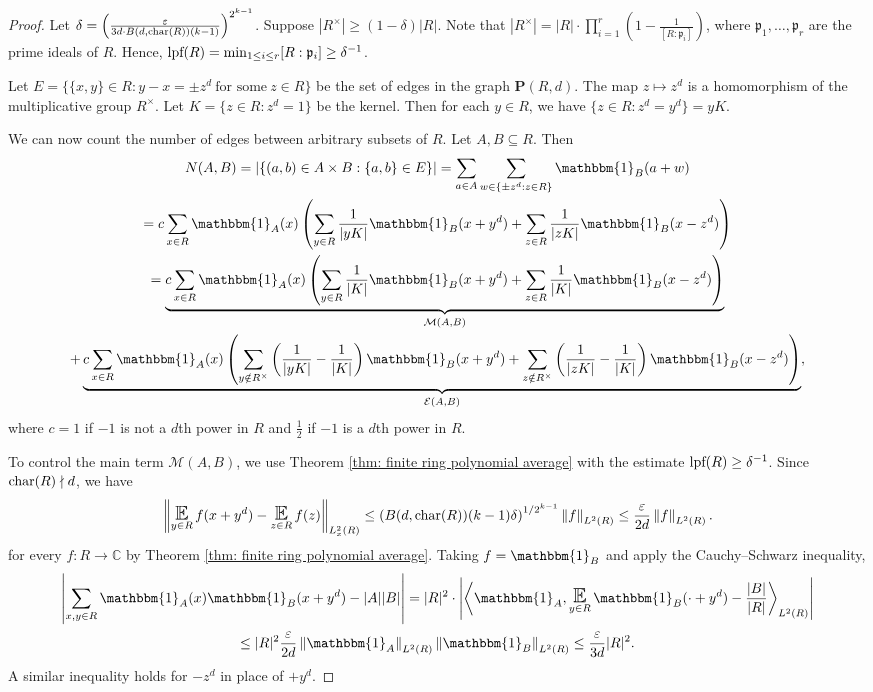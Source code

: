 \documentclass{amsart}
\theoremstyle{definition}
\numberwithin{equation}{section}
\newcommand{\C}{\mathbb{C}}
\newcommand{\p}{\mathfrak{p}}
\newcommand{\bfP}{\mathbf{P}}
\newcommand{\eps}{\varepsilon}
\newcommand{\lpf}{\normalfont\text{lpf}}
\DeclareMathOperator*{\E}{\text{\Large $\mathbb{E}$}}
\newcommand{\ind}{\mathbbm{1}}
\newcommand{\innprod}[2]{\left\langle #1, #2 \right\rangle}
\newcommand{\norm}[2]{\left\| #2 \right\|_{#1}}
\renewcommand{\char}{\textup{char}}
\begin{document}
\begin{proof}
    Let $\delta = \left( \frac{\eps}{3d \cdot B(d,\char(R)) (k-1)} \right)^{2^{k-1}}$.
    Suppose $|R^{\times}| \ge (1 - \delta)|R|$.
    Note that $|R^{\times}| = |R| \cdot \prod_{i=1}^r \left( 1 - \frac{1}{[R:\p_i]} \right)$, where $\p_1, \ldots, \p_r$ are the prime ideals of $R$.
    Hence, $\lpf(R) = \min_{1 \le i \le r} [R:\p_i] \ge \delta^{-1}$.

    
    Let $E = \{\{x,y\} \in R : y - x = \pm z^d~\text{for some}~z \in R\}$ be the set of edges in the graph $\bfP(R,d)$.
    The map $z \mapsto z^d$ is a homomorphism of the multiplicative group $R^{\times}$.
    Let $K = \{z \in R : z^d = 1\}$ be the kernel.
    Then for each $y \in R$, we have $\{z \in R : z^d = y^d\} = yK$.

    We can now count the number of edges between arbitrary subsets of $R$.
    Let $A, B \subseteq R$.
    Then
    \begin{multline*}
        N(A,B) = |\{(a,b) \in A \times B : \{a,b\} \in E\}|
        = \sum_{a \in A} \sum_{w \in \{\pm z^d : z \in R\}} \ind_B(a + w) \\
        = c \sum_{x \in R} \ind_A(x) \left( \sum_{y \in R} \frac{1}{|yK|}\ind_B(x+y^d) + \sum_{z \in R} \frac{1}{|zK|} \ind_B(x - z^d) \right) \\
         = \underbrace{c \sum_{x \in R} \ind_A(x) \left( \sum_{y \in R} \frac{1}{|K|} \ind_B(x+y^d) + \sum_{z \in R} \frac{1}{|K|} \ind_B(x-z^d) \right)}_{\mathcal{M}(A,B)} \\
         + \underbrace{c \sum_{x \in R} \ind_A(x) \left( \sum_{y \notin R^{\times}} \left( \frac{1}{|yK|} - \frac{1}{|K|} \right) \ind_B(x+y^d) + \sum_{z \notin R^{\times}} \left( \frac{1}{|zK|} - \frac{1}{|K|} \right) \ind_B(x-z^d) \right)}_{\mathcal{E}(A,B)},
    \end{multline*}
    where $c = 1$ if $-1$ is not a $d$th power in $R$ and $\frac{1}{2}$ if $-1$ is a $d$th power in $R$.
    
    To control the main term $\mathcal{M}(A,B)$, we use Theorem \ref{thm: finite ring polynomial average} with the estimate $\lpf(R) \ge \delta^{-1}$.
    Since $\char(R) \nmid d$, we have
    \begin{equation*}
        \norm{L^2_x(R)}{\E_{y \in R} f(x+y^d) - \E_{z \in R} f(z)} \le \left( B(d,\char(R)) (k-1)\delta \right)^{1/2^{k-1}} \norm{L^2(R)}{f} \le \frac{\eps}{2d} \norm{L^2(R)}{f}.
    \end{equation*}
    for every $f : R \to \C$ by Theorem \ref{thm: finite ring polynomial average}.
    Taking $f = \ind_B$ and apply the Cauchy--Schwarz inequality,
    \begin{multline*}
        \left| \sum_{x,y \in R} \ind_A(x) \ind_B(x+y^d) - |A||B| \right| = |R|^2 \cdot \left| \innprod{\ind_A}{\E_{y \in R}\ind_B(\cdot+y^d) - \frac{|B|}{|R|}}_{L^2(R)} \right| \\
         \le |R|^2 \frac{\eps}{2d} \norm{L^2(R)}{\ind_A} \norm{L^2(R)}{\ind_B} \le \frac{\eps}{3d} |R|^2.
    \end{multline*}
    A similar inequality holds for $-z^d$ in place of $+y^d$.
    

\end{proof}
\end{document}
